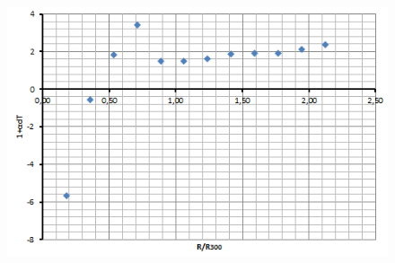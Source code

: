 \documentclass{article}
\begin{document}
\begin{figure}[H]
\centering
\includegraphics[scale=0.8]{variacionalpha.png}
\end{figure}
\end{document}
